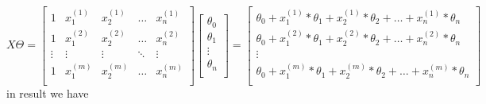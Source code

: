\documentclass{article} %
\begin{document}
\begin{equation*}
X \Theta = 
\begin{bmatrix} 
1 	& x^{(1)}_1	& x^{(1)}_2 	& \dots 	& x^{(1)}_n \\ 
1 	& x^{(2)}_1 	& x^{(2)}_2	& \dots 	& x^{(2)}_n \\
\vdots 	& \vdots 	& \vdots		& \ddots	& \vdots \\
1 	& x^{(m)}_1 	& x^{(m)}_2	& \dots 	& x^{(m)}_n \\
\end{bmatrix}  
\begin{bmatrix} 
\theta_0 \\ 
\theta_1 \\
\vdots \\
\theta_n \\
\end{bmatrix} 
= 
\begin{bmatrix} 
\theta_0 + x^{(1)}_1*\theta_1 + x^{(1)}_2*\theta_2 + \dots 	+ x^{(1)}_n*\theta_n \\ 
\theta_0 + x^{(2)}_1*\theta_1 + x^{(2)}_2*\theta_2 + \dots 	+ x^{(2)}_n*\theta_n \\
\vdots \\
\theta_0 + x^{(m)}_1*\theta_1 + x^{(m)}_2*\theta_2 + \dots 	+ x^{(m)}_n*\theta_n\\
\end{bmatrix}  
\end{equation*}
in result we have
\end{document}

